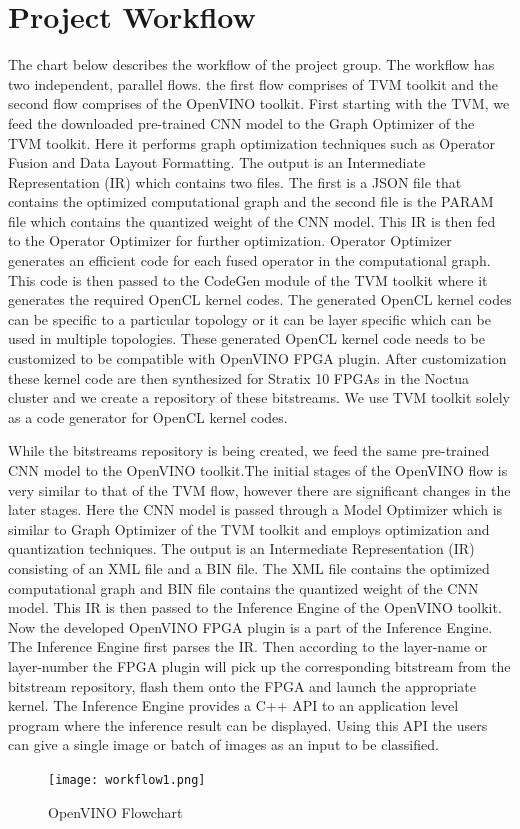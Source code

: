 \documentclass[titlepage]{report}
\begin{document}
 \section{Project Workflow}
 The chart below describes the workflow of the project group. The workflow has two independent, parallel flows. the first flow comprises of TVM toolkit and the second flow comprises of the OpenVINO toolkit. First starting with the TVM, we feed the downloaded pre-trained CNN model to the Graph Optimizer of the TVM toolkit. Here it performs graph optimization techniques such as Operator Fusion and Data Layout Formatting. The output is an Intermediate Representation (IR) which contains two files. The first is a JSON file that contains the optimized computational graph and the second file is the PARAM file which contains the quantized weight of the CNN model. This IR is then fed to the Operator Optimizer for further optimization. Operator Optimizer generates an efficient code for each fused operator in the computational graph. This code is then passed to the CodeGen module of the TVM toolkit where it generates the required OpenCL kernel codes. The generated OpenCL kernel codes can be specific to a particular topology or it can be layer specific which can be used in multiple topologies. These generated OpenCL kernel code needs to be customized to be compatible with OpenVINO FPGA plugin. After customization these kernel code are then synthesized for Stratix 10 FPGAs in the Noctua cluster and we create a repository of these bitstreams. We use TVM toolkit solely as a code generator for OpenCL kernel codes.
 
 While the bitstreams repository is being created, we feed the same pre-trained CNN model to the OpenVINO toolkit.The initial stages of the OpenVINO flow is very similar to that of the TVM flow, however there are significant changes in the later stages. Here the CNN model is passed through a Model Optimizer which is similar to Graph Optimizer of the TVM toolkit and employs optimization and quantization techniques. The output is an Intermediate Representation (IR) consisting of an XML file and a BIN file. The XML file contains the optimized computational graph and BIN file contains the quantized weight of the CNN model. This IR is then passed to the Inference Engine of the OpenVINO toolkit. Now the developed OpenVINO FPGA plugin is a part of the Inference Engine. The Inference Engine first parses the IR. Then according to the layer-name or layer-number the FPGA plugin will pick up the corresponding bitstream from the bitstream repository, flash them onto the FPGA and launch the appropriate kernel. The Inference Engine provides a C++ API to an application level program where the inference result can be displayed. Using this API the users can give a single image or batch of images as an input to be classified.
 \begin{figure}[h!]
    \centering
    \texttt{[image: workflow1.png]}
    \caption{OpenVINO Flowchart}
\end{figure}
\end{document}
